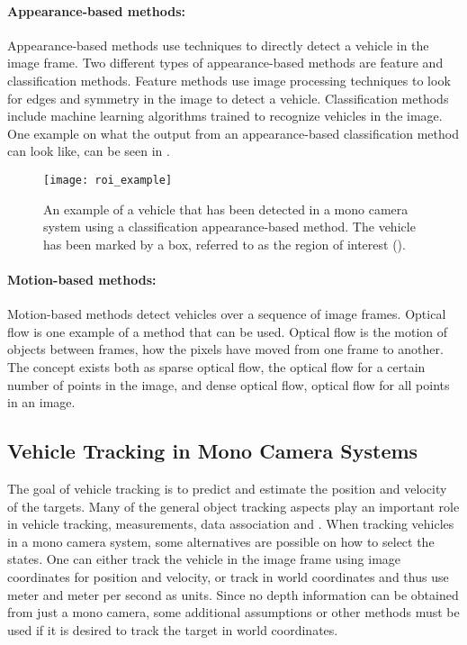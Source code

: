 \paragraph{Appearance-based methods:}
Appearance-based methods use techniques to directly detect a vehicle in the image frame.
Two different types of appearance-based methods are feature and classification methods.
Feature methods use image processing techniques to look for \eg edges and symmetry in the image to detect a vehicle.
Classification methods include machine learning algorithms trained to recognize vehicles in the image.
One example on what the output from an appearance-based classification method can look like, can be seen in .

\begin{figure}[!ht]
	\centering
	\texttt{[image: roi\_example]}
	\caption{\label{fig:roiexample} An example of a vehicle that has been detected in a mono camera system using a classification appearance-based method. The vehicle has been marked by a box, referred to as the region of interest (\abbrROI).}
\end{figure}

\paragraph{Motion-based methods:}
Motion-based methods detect vehicles over a sequence of image frames.
Optical flow is one example of a method that can be used.
Optical flow is the motion of objects between frames, \ie how the pixels have moved from one frame to another.
The concept exists both as sparse optical flow, \ie the optical flow for a certain number of points in the image, and dense optical flow, \ie optical flow for all points in an image.

\subsection{Vehicle Tracking in Mono Camera Systems}
The goal of vehicle tracking is to predict and estimate \eg the position and velocity of the targets.
Many of the general object tracking aspects play an important role in vehicle tracking, \eg measurements, data association and \abbrMTT.
When tracking vehicles in a mono camera system, some alternatives are possible on how to select the states.
One can either track the vehicle in the image frame using image coordinates for position and velocity, or track in  world coordinates and thus use meter and meter per second as units.
Since no depth information can be obtained from just a mono camera, some additional assumptions or other methods must be used if it is desired to track the target in  world coordinates.

